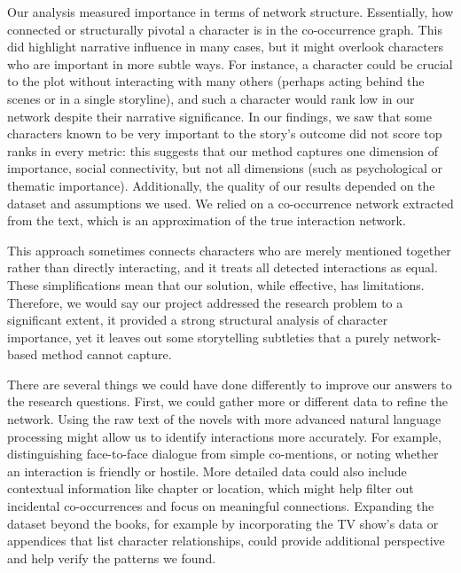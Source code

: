 \documentclass[12pt, a4paper]{article}
\begin{document}
Our analysis measured importance in terms of network structure. Essentially, how connected or structurally pivotal a character 
is in the co-occurrence graph. This did highlight narrative influence in many cases, but it might overlook characters who are important in more subtle ways. 
For instance, a character could be crucial to the plot without interacting with many others (perhaps acting behind the scenes or in a single storyline), 
and such a character would rank low in our network despite their narrative significance. In our findings, we saw that some characters known to be very 
important to the story’s outcome did not score top ranks in every metric: this suggests that our method captures one dimension of importance,
social connectivity, but not all dimensions (such as psychological or thematic importance). Additionally, the quality of our results depended 
on the dataset and assumptions we used. We relied on a co-occurrence network extracted from the text, which is an approximation of the true interaction network.
 
This approach sometimes connects characters who are merely mentioned together rather than directly interacting, and it treats all detected interactions as
  equal. These simplifications mean that our solution, while effective, has limitations. Therefore, we would say our project addressed the 
  research problem to a significant extent, it provided a strong structural analysis of character importance, 
  yet it leaves out some storytelling subtleties that a purely network-based method cannot capture.

There are several things we could have done differently to improve our answers to the research questions. 
First, we could gather more or different data to refine the network. 
Using the raw text of the novels with more advanced natural language processing might allow us to identify 
interactions more accurately. 
For example, distinguishing face-to-face dialogue from simple co-mentions, 
or noting whether an interaction is friendly or hostile. 
More detailed data could also include contextual information like chapter or location, 
which might help filter out incidental co-occurrences and focus on meaningful connections. 
Expanding the dataset beyond the books, for example by incorporating the TV show’s data or appendices that list character relationships,
could provide additional perspective and help verify the patterns we found. 
\end{document}

